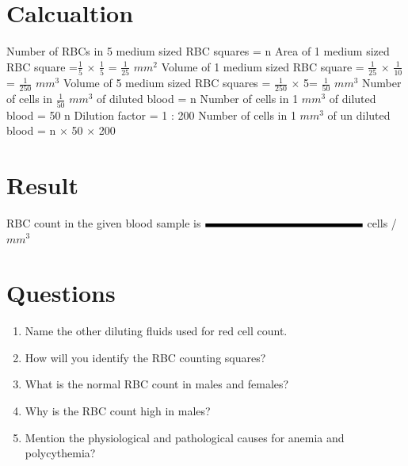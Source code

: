 \documentclass[a4paper,12pt]{book}
\begin{document}
					\section*{Calcualtion}
					Number of RBCs in 5 medium sized RBC squares = n\newline\vspace{.4cm}
					Area of 1 medium  sized RBC square =$\frac{1}{5}$ $\times$ $\frac{1}{5}$ = $\frac{1}{25}$ $mm^2$\newline\vspace{.4cm}
					Volume of 1 medium sized RBC square = $\frac{1}{25}$ $\times$ $\frac{1}{10}$ = $\frac{1}{250}$ $mm^3$\newline\vspace{.4cm}
					Volume of 5 medium sized RBC squares = $\frac{1}{250}$ $\times$ 5= $\frac{1}{50}$ $mm^3$\newline\vspace{.4cm}
					Number of cells in  $\frac{1}{50}$ $mm^3$ of diluted blood  = n\newline\vspace{.4cm}
					Number of cells in  1 $mm^3$  of diluted blood = 50 n\newline\vspace{.4cm}
					Dilution factor = 1 : 200\newline\vspace{.4cm}
					Number of cells in 1 $mm^3$ of un diluted blood 	= n $\times$ 50 $\times$ 200  \newline\vspace{.4cm}

					\section*{Result}
					RBC  count in the given  blood sample is $\rule{5cm}{0.1cm}$ cells / $mm^3$
					\section*{Questions}
					\begin{enumerate}

						\item {Name the other diluting fluids used for red  cell count.}
						\item{How will you identify the RBC counting squares?}
						\item{What is the normal RBC count in males and females?}
						\item{Why is the RBC count high in males?}
						\item{Mention the physiological and pathological causes for anemia and polycythemia?}


					\end{enumerate}
\end{document}
